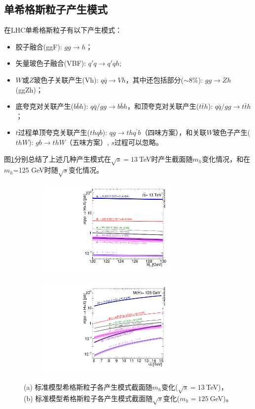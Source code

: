 \subsection{单希格斯粒子产生模式}
在LHC单希格斯粒子有以下产生模式：
\begin{itemize}
 \item 胶子融合(ggF): $gg\rightarrow h$；
 \item 矢量玻色子融合(VBF): $q\prime{q}\rightarrow q\prime{q}h$;
 \item $W$或$Z$玻色子关联产生(Vh): $q\bar{q}\rightarrow Vh$，其中还包括部分($\sim$8\%): $gg\rightarrow Zh$ (ggZh)；
 \item 底夸克对关联产生($b\bar{b}h$): $q\bar{q}/gg\rightarrow b\bar{b}h$，和顶夸克对关联产生($t\bar{t}h$): $q\bar{q}/gg\rightarrow t\bar{t}h$；
 \item $t$过程单顶夸克关联产生($thqb$): $qg\rightarrow th{q}^{\prime}b$（四味方案），和关联$W$玻色子产生($thW$): $gb\rightarrow thW$（五味方案）, $s$过程可以忽略。
\end{itemize}
图\ref{fig:LHCHIGGSWG}分别总结了上述几种产生模式在$\sqrt{s}=13~$TeV时产生截面随$m_h$变化情况，和在$m_h$=125 GeV时随$\sqrt{s}$变化情况。
\begin{figure}[h]
\centering
 \begin{subfigure}[b]{0.45\textwidth}
  \includegraphics[width=0.75\textwidth,angle=-90]{fig/plot_13tev_H_sqrt.pdf}
  \caption{}
 \end{subfigure}
 \begin{subfigure}[b]{0.45\textwidth}
  \includegraphics[width=0.75\textwidth,angle=-90]{fig/Plot_Escan_H125_new_sqrt.pdf}
  \caption{}
 \end{subfigure}
\caption{(a) 标准模型希格斯粒子各产生模式截面随$m_h$变化($\sqrt{s}=13~$TeV)，(b) 标准模型希格斯粒子各产生模式截面随$\sqrt{s}$变化($m_h=125~$GeV)。}
\label{fig:LHCHIGGSWG}
\end{figure}

